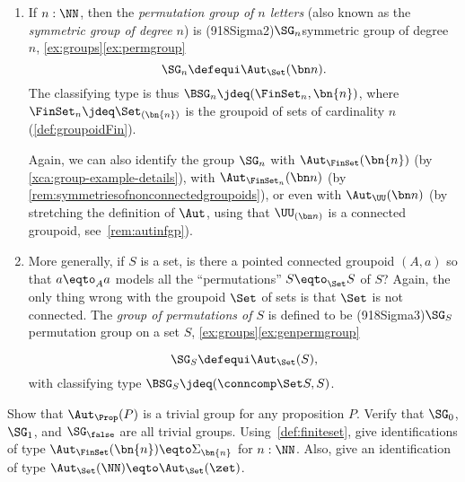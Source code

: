 \begin{example}
\begin{enumerate}
{Issues concerning universes are nontrivial and important,
but in this text we have chosen to focus on other matters.
}
 
  \item\label{ex:permgroup}
    If $n:\NN$, then the \emph{permutation group of $n$ letters}
    (also known as the \emph{symmetric group of degree $n$}) is%
    \glossary(918Sigma2){$\protect\SG_n$}{symmetric group of degree $n$,
      \cref{ex:groups}\ref{ex:permgroup}}%
    \[
      \SG_n\defequi \Aut_{\Set}(\bn n). %
    \]
    The classifying type is thus $\BSG_n\jdeq (\FinSet_n,\bn{n})$,   
    where $\FinSet_n \jdeq \Set_{(\bn{n})}$ is the groupoid of 
    sets of cardinality $n$ (\cf \ref{def:groupoidFin}).
    
    Again, we can also identify the group $\SG_n$ with
    $\Aut_\FinSet(\bn{n})$ (by \cref{xca:group-example-details}), with 
    $\Aut_{\FinSet_n}(\bn n)$ (by \cref{rem:symmetriesofnonconnectedgroupoids}),
    or even with $\Aut_{\UU}(\bn n)$ (by stretching the definition of $\Aut$,
    using that $\UU_{(\bn n)}$ is a connected groupoid, see~\cref{rem:autinfgp}).



  \item\label{ex:genpermgroup}
    More generally, if $S$ is a set, is there a pointed connected groupoid $(A,a)$ so that $a\eqto_Aa$ models all the ``permutations'' $S\eqto_{\Set}S$ of $S$?
    Again, the only thing wrong with the groupoid $\Set$ of sets
    is that $\Set$ is not connected.
    The \emph{group of permutations of $S$} is defined to be%
    \glossary(918Sigma3){$\protect\SG_S$}{permutation group on a set $S$,
      \cref{ex:groups}\ref{ex:genpermgroup}}%

    \[
      \SG_S\defequi \Aut_{\Set}(S),
    \]
    with classifying type $\BSG_S\jdeq(\conncomp \Set S,S)$.\qedhere
  \end{enumerate}
\end{example}

\begin{xca}
  \label{xca:group-example-details}
  Show that $\Aut_\Prop(P)$ is a trivial group for any proposition $P$.
  Verify that $\SG_0$, $\SG_1$, and $\SG_\false$ are all trivial groups.
  Using~\cref{def:finiteset}, give identifications of type 
  $\Aut_\FinSet(\bn{n})\eqto\Sigma_{\bn{n}}$ for $n:\NN$.
  Also, give an identification of type $\Aut_\Set(\NN)\eqto\Aut_\Set(\zet)$. 
\end{xca}


